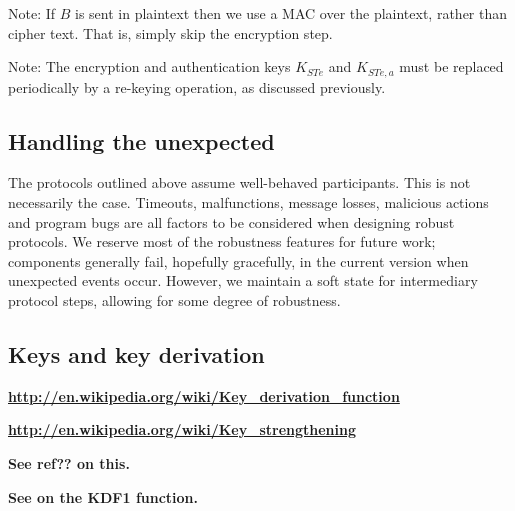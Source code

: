 Note: If $B$ is sent in plaintext then we use a MAC over the
plaintext, rather than cipher text. That is, simply skip the
encryption step.

Note: The encryption and authentication keys $K_{STe}$ and $K_{STe,a}$
must be replaced periodically by a re-keying operation, as discussed
previously.

\subsection{Handling the unexpected}

The protocols outlined above assume well-behaved participants. This is
not necessarily the case. Timeouts, malfunctions, message losses,
malicious actions and program bugs are all factors to be considered
when designing robust protocols. We reserve most of the robustness
features for future work; components generally fail, hopefully
gracefully, in the current version when unexpected events
occur. However, we maintain a soft state for intermediary protocol
steps, allowing for some degree of robustness.

\subsection{Keys and key derivation}

\textbf{\url{http://en.wikipedia.org/wiki/Key_derivation_function}}

\textbf{\url{http://en.wikipedia.org/wiki/Key_strengthening}}

\textbf{See ref?? on this.}

\textbf{See \cite{ieee-1363-2000} on the KDF1 function.}


